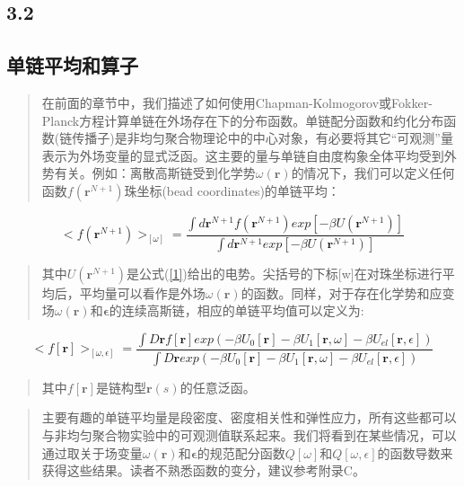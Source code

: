 \subsection{3.2}
\subsection{单链平均和算子}
\begin{quotation}
在前面的章节中，我们描述了如何使用Chapman-Kolmogorov或Fokker-Planck方程计算单链在外场存在下的分布函数。单链配分函数和约化分布函数(链传播子)是非均匀聚合物理论中的中心对象，有必要将其它“可观测”量表示为外场变量的显式泛函。这主要的量与单链自由度构象全体平均受到外势有关。例如：离散高斯链受到化学势$\omega (\mathbf{r})$的情况下，我们可以定义任何函数$f(\mathbf{r}^{N+1})$珠坐标(bead coordinates)的单链平均：
\end{quotation}
\begin{equation}\label{1}
<f(\mathbf{r}^{N+1})>_{[\omega]}= \frac{\int d \mathbf{r}^{N+1} f(\mathbf{r}^{N+1})exp[-\beta U(\mathbf{r}^{N+1})]}{\int d\mathbf{r}^{N+1}exp[-\beta U(\mathbf{r}^{N+1})]}
\end{equation}
\begin{quotation}
其中$U(\mathbf{r}^{N+1})$是公式(\ref{1})给出的电势。尖括号的下标[w]在对珠坐标进行平均后，平均量可以看作是外场$\omega(\mathbf{r})$的函数。同样，对于存在化学势和应变场$\omega(\mathbf{r})$和$\mathbf{\epsilon}$的连续高斯链，相应的单链平均值可以定义为:
\end{quotation}
\begin{equation}\label{2}
<f[\mathbf{r}]>_{[\omega ,\epsilon]}=\frac{\int D\mathbf{r}f[\mathbf{r}]exp(-\beta U_{0}[\mathbf{r}]-\beta U_{1}[\mathbf{r},\omega]-\beta U_{el}[\mathbf{r},\epsilon])}{\int D\mathbf{r}exp(-\beta U_{0}[\mathbf{r}]-\beta U_{1}[\mathbf{r},\omega]-\beta U_{el}[\mathbf{r},\epsilon])}
\end{equation}
\begin{quotation}
其中$f[\mathbf{r}]$是链构型$\mathbf{r}(s)$的任意泛函。
\end{quotation}
\begin{quotation}
主要有趣的单链平均量是段密度、密度相关性和弹性应力，所有这些都可以与非均匀聚合物实验中的可观测值联系起来。我们将看到在某些情况，可以通过取关于场变量$\omega(\mathbf{r})$和$\mathbf{\epsilon}$的规范配分函数$Q[\omega]$和$Q[\omega,\epsilon]$的函数导数来获得这些结果。读者不熟悉函数的变分，建议参考附录C。
\end{quotation}
